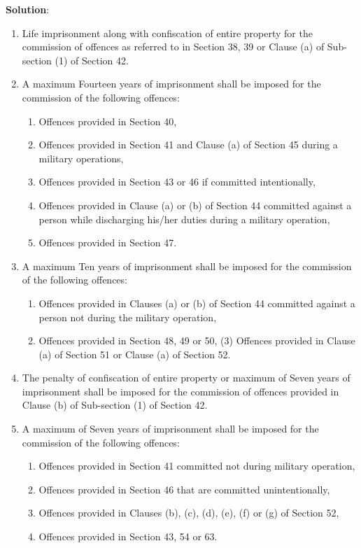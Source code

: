 \documentclass[
]{book}
\newenvironment{solution}{ {\bfseries Solution}:}{}
\begin{document}
\begin{questions}
\begin{solution}
\begin{enumerate}
  \item Life imprisonment along with confiscation of entire property for the commission of offences as referred to in Section 38, 39 or Clause (a) of Sub-section (1) of Section 42.
  \item A maximum Fourteen years of imprisonment shall be imposed for the commission of the following offences:
  \begin{enumerate}
    \item Offences provided in Section 40,
    \item Offences provided in Section 41 and Clause (a) of Section 45 during a military operations,
    \item Offences provided in Section 43 or 46 if committed intentionally,
    \item Offences provided in Clause (a) or (b) of Section 44 committed against a person while discharging his/her duties during a military operation,
    \item Offences provided in Section 47.
  \end{enumerate}
  \item A maximum Ten years of imprisonment shall be imposed for the commission of the following offences:
  \begin{enumerate}
    \item Offences provided in Clauses (a) or (b) of Section 44 committed against a person not during the military operation,
    \item Offences provided in Section 48, 49 or 50, (3) Offences provided in Clause (a) of Section 51 or Clause (a) of Section 52.
  \end{enumerate}
  \item The penalty of confiscation of entire property or maximum of Seven years of imprisonment shall be imposed for the commission of offences provided in Clause (b) of Sub-section (1) of Section 42.
  \item A maximum of Seven years of imprisonment shall be imposed for the commission of the following offences:
  \begin{enumerate}
    \item Offences provided in Section 41 committed not during military operation,
    \item Offences provided in Section 46 that are committed unintentionally,
    \item Offences provided in Clauses (b), (c), (d), (e), (f) or (g) of Section 52,
    \item Offences provided in Section 43, 54 or 63.

\end{enumerate}
\end{enumerate}
\end{solution}
\end{questions}
\end{document}
